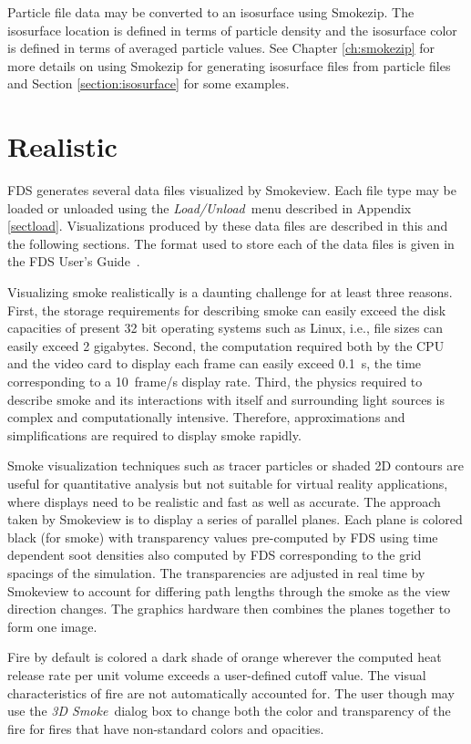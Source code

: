 \documentclass[11pt,twoside]{book}
\begin{document}
Particle file data may be converted to an isosurface using
Smokezip.  The isosurface location is defined in terms of particle
density and the isosurface color is defined in terms of averaged
particle values. See  Chapter \ref{ch:smokezip} for more details
on using Smokezip for generating isosurface files from particle
files and Section \ref{section:isosurface} for some examples.

\section{Realistic}
FDS generates several data files visualized by Smokeview. Each
file type may be loaded or unloaded using the {\em Load/Unload}\
menu described in Appendix \ref{sectload}. Visualizations produced
by these data files are described in this and the following
sections. The format used to store each of the data files is given
in the FDS User's Guide~\cite{FDS_Users_Guide}.

Visualizing smoke realistically is a daunting challenge for at
least three reasons. First, the storage requirements for
describing smoke can easily exceed the disk capacities of present
32 bit operating systems such as Linux, i.e., file sizes can easily
exceed 2 gigabytes. Second, the computation required both by the
CPU and the video card to display each frame can easily exceed
0.1~s, the time corresponding to a 10~frame/s display rate. Third,
the physics required to describe smoke and its interactions with
itself and surrounding light sources is complex and
computationally intensive. Therefore, approximations and
simplifications are required to display smoke rapidly.

Smoke visualization techniques such as tracer particles or shaded
2D contours are useful for quantitative analysis but not suitable
for virtual reality applications, where displays need to be
realistic and fast as well as accurate. The approach taken by
Smokeview is to display a series of parallel planes.  Each plane
is colored black (for smoke) with transparency values pre-computed
by FDS using time dependent soot densities also computed by FDS
corresponding to the grid spacings of the simulation. The
transparencies are adjusted in real time by Smokeview to account
for differing path lengths through the smoke as the view direction
changes. The graphics hardware then combines the planes together
to form one image.

Fire by default is colored a dark shade of orange wherever the
computed heat release rate per unit volume exceeds a user-defined
cutoff value.  The visual characteristics of fire are not
automatically accounted for.  The user though may use the {\em 3D
Smoke}\ dialog box to change both the color and transparency of
the fire for fires that have non-standard colors and opacities.
\end{document}
